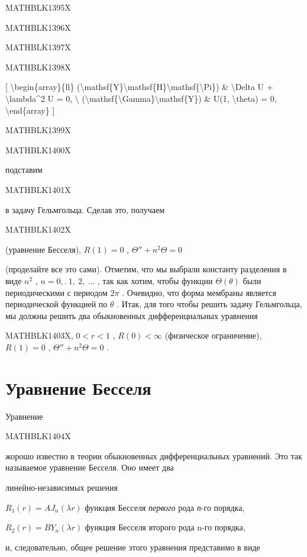 \documentclass[
]{article}
\begin{document}
MATHBLK1395X

MATHBLK1396X

MATHBLK1397X

MATHBLK1398X

{[} \textbackslash begin\{array\}\{ll\}
(\textbackslash mathsf\{Y\}\textbackslash mathsf\{H\}\textbackslash mathsf\{\textbackslash Pi\})
\& \textbackslash Delta U + \textbackslash lambda\^{}2 U = 0,
\textbackslash{}
(\textbackslash mathsf\{\textbackslash Gamma\}\textbackslash mathsf\{Y\})
\& U(1, \textbackslash theta) = 0, \textbackslash end\{array\} {]}

MATHBLK1399X

MATHBLK1400X

подставим

MATHBLK1401X

в задачу Гельмгольца. Сделав это, получаем

MATHBLK1402X

(уравнение Бесселя), \(R(1) = 0\) , \(\Theta'' + n^2\Theta = 0\)

(проделайте все это сами). Отметим, что мы выбрали константу разделения
в виде \(n^2\) , \(n=0,. \ 1,\ 2,\ \ldots\) , так как хотим, чтобы
функции \(\Theta\left(\theta\right)\) были периодическими с периодом
\(2\pi\) . Очевидно, что форма мембраны является периодической функцией
по \(\theta\) . Итак, для того чтобы решить задачу Гельмгольца, мы
должны решить два обыкновенных дифференциальных уравнения

MATHBLK1403X, \(0 < r < 1\) , \(R(0) < \infty\) (физическое
ограничение), \(R(1) = 0\) , \(\Theta'' + n^2\Theta = 0\) .

\section{Уравнение
Бесселя}\label{ux443ux440ux430ux432ux43dux435ux43dux438ux435-ux431ux435ux441ux441ux435ux43bux44f}

Уравнение

MATHBLK1404X

жорошо известно в теории обыкновенных дифференциальных уравнений. Это
так называемое уравнение Бесселя. Оно имеет два

линейно-независимых решения

\(R_{1}(r) = A J_{n}(\lambda r)\) функция Бесселя \emph{первого} рода
\emph{п}-го порядка,

\(R_{2}(r) = BY_{n}(\lambda r)\) функция Бесселя второго рода n-го
порядка,

и, следовательно, общее решение этого уравнения представимо в виде
\end{document}

